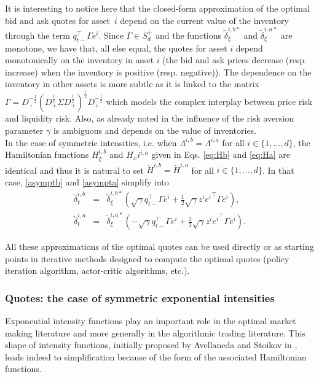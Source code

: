 \documentclass[preprint, 3p]{elsarticle}
\newcommand{\1}{{\chi}}
\begin{document}
It is interesting to notice here that the closed-form approximation of the optimal bid and ask quotes for asset~$i$ depend on the current value of the inventory through the term $q_{t-}^\intercal \Gamma e^i$. Since $\Gamma \in S_d^+$ and the functions $\tilde{\delta}^{i,b*}_\xi$ and $\tilde{\delta}^{i,a*}_\xi$ are monotone, we have that, all else equal, the quotes for asset $i$ depend monotonically on the inventory in asset $i$ (the bid and ask prices decrease (resp. increase) when the inventory is positive (resp. negative)). The dependence on the inventory in other assets is more subtle as it is linked to the matrix $\Gamma=D_+^{-\frac 1 2}(D_+^{\frac 12}\Sigma D_+^{\frac 12})^{\frac 12} D_+^{-\frac 1 2}$ which models the complex interplay between price risk and liquidity risk. Also, as already noted in \cite{gueant2013dealing} the influence of the risk aversion parameter $\gamma$ is ambiguous and depends on the value of inventories. \\

In the case of symmetric intensities, i.e. when $\Lambda^{i,b} = \Lambda^{i,a}$  for all $i \in \{1, \ldots, d\}$, the Hamiltonian functions $H_\xi^{i,b}$ and $H_xi^{i,a}$ given in Eqs. \eqref{eq:Hb} and \eqref{eq:Ha} are identical and thus it is natural to set $\check{H}^{i,b} = \check{H}^{i,a}$ for all $i \in \{1, \ldots, d\}$. In that case, \eqref{asymptb} and \eqref{asympta} simplify into
\begin{eqnarray}
	\breve\delta^{i,b}_t &=& \tilde{\delta}^{i,b*}_\xi\left(\sqrt\gamma q_{t-}^\intercal \Gamma e^i + \frac 12 \sqrt\gamma z^i {e^i}^\intercal \Gamma e^i\right),\label{asymptbsym}\\
	\breve\delta^{i,a}_t &=& \tilde{\delta}^{i,a*}_\xi\left(-\sqrt\gamma q_{t-}^\intercal \Gamma e^i + \frac 12 \sqrt\gamma z^i {e^i}^\intercal \Gamma e^i\right).\label{asymptasym}
	\end{eqnarray}

All these approximations of the optimal quotes can be used directly or as starting points in iterative methods designed to compute the optimal quotes (policy iteration algorithm, actor-critic algorithms, etc.).\\

\subsubsection{Quotes: the case of symmetric exponential intensities}
\vspace{3mm}
Exponential intensity functions play an important role in the optimal market making literature and more generally in the algorithmic trading literature. This shape of intensity functions, initially proposed by Avellaneda and Stoikov in \cite{avellaneda2008high}, leads indeed to simplification because of the form of the associated Hamiltonian functions.\\
\end{document}
